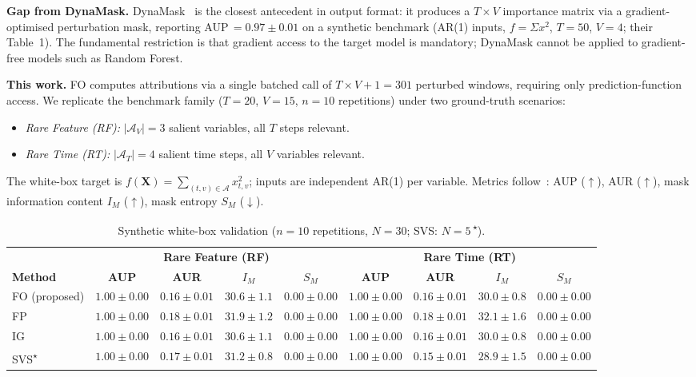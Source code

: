 \documentclass[runningheads]{llncs}
\begin{document}
\textbf{Gap from DynaMask.}
DynaMask~\cite{crabbe2021} is the closest antecedent in output
format: it produces a $T{\times}V$ importance matrix via a
gradient-optimised perturbation mask, reporting AUP\,$=0.97\pm0.01$
on a synthetic benchmark (AR(1) inputs, $f{=}\Sigma x^2$,
$T{=}50$, $V{=}4$; their Table~1).
The fundamental restriction is that gradient access to the target
model is mandatory; DynaMask cannot be applied to gradient-free
models such as Random Forest.

\textbf{This work.}
FO computes attributions via a single batched call of
$T{\times}V{+}1{=}301$ perturbed windows, requiring only
prediction-function access. We replicate the benchmark family
($T{=}20$, $V{=}15$, $n{=}10$ repetitions) under two ground-truth
scenarios:

\begin{itemize}\setlength\itemsep{0pt}
  \item \textit{Rare Feature (RF):} $|\mathcal{A}_V|{=}3$
    salient variables, all $T$ steps relevant.
  \item \textit{Rare Time (RT):} $|\mathcal{A}_T|{=}4$ salient
    time steps, all $V$ variables relevant.
\end{itemize}

The white-box target is $f(\mathbf{X}) = \sum_{(t,v)\in\mathcal{A}}
x_{t,v}^{2}$; inputs are independent AR(1) per variable.
Metrics follow~\cite{crabbe2021}: AUP ($\uparrow$), AUR ($\uparrow$),
mask information content $I_M$ ($\uparrow$), mask entropy $S_M$
($\downarrow$).

\begin{table}[ht]
\caption{Synthetic white-box validation ($n{=}10$ repetitions,
         $N{=}30$; SVS: $N{=}5$\,\textsuperscript{$\star$}).}
\label{tab:exp1_synthetic}
\centering
\scriptsize
\setlength{\tabcolsep}{4pt}
\begin{tabular}{lcccccccc}
\toprule
& \multicolumn{4}{c}{\textbf{Rare Feature (RF)}}
& \multicolumn{4}{c}{\textbf{Rare Time (RT)}} \\
\cmidrule(lr){2-5}\cmidrule(lr){6-9}
\textbf{Method} & \textbf{AUP} & \textbf{AUR}
  & $I_M$ & $S_M$
  & \textbf{AUP} & \textbf{AUR}
  & $I_M$ & $S_M$ \\
\midrule
FO (proposed)
  & $1.00{\pm}0.00$ & $0.16{\pm}0.01$ & $30.6{\pm}1.1$ & $0.00{\pm}0.00$
  & $1.00{\pm}0.00$ & $0.16{\pm}0.01$ & $30.0{\pm}0.8$ & $0.00{\pm}0.00$ \\
FP
  & $1.00{\pm}0.00$ & $0.18{\pm}0.01$ & $31.9{\pm}1.2$ & $0.00{\pm}0.00$
  & $1.00{\pm}0.00$ & $0.18{\pm}0.01$ & $32.1{\pm}1.6$ & $0.00{\pm}0.00$ \\
IG
  & $1.00{\pm}0.00$ & $0.16{\pm}0.01$ & $30.6{\pm}1.1$ & $0.00{\pm}0.00$
  & $1.00{\pm}0.00$ & $0.16{\pm}0.01$ & $30.0{\pm}0.8$ & $0.00{\pm}0.00$ \\
SVS\textsuperscript{$\star$}
  & $1.00{\pm}0.00$ & $0.17{\pm}0.01$ & $31.2{\pm}0.8$ & $0.00{\pm}0.00$
  & $1.00{\pm}0.00$ & $0.15{\pm}0.01$ & $28.9{\pm}1.5$ & $0.00{\pm}0.00$ \\
\bottomrule
\end{tabular}
\end{table}
\end{document}
